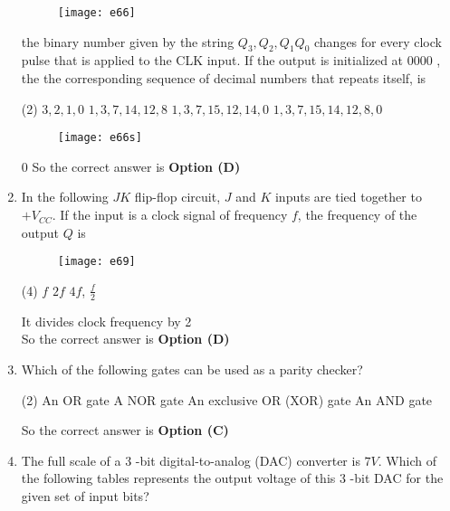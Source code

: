 \begin{enumerate}
	\begin{figure}[H]
		\centering
		\texttt{[image: e66]}
	\end{figure}
	the binary number given by the string $Q_{3}, Q_{2}, Q_{1} Q_{0}$ changes for every clock pulse that is applied to the CLK input. If the output is initialized at 0000 , the the corresponding sequence of decimal numbers that repeats itself, is
{	}
\begin{tasks}(2)
\task[\textbf{A.}] $3,2,1,0$
\task[\textbf{B.}] $1,3,7,14,12,8$
\task[\textbf{C.}] $1,3,7,15,12,14,0$
\task[\textbf{D.}] $1,3,7,15,14,12,8,0$
\end{tasks}
\begin{answer}
\begin{figure}[H]
	\centering
	\texttt{[image: e66s]}
\end{figure}0
So the correct answer is \textbf{Option (D)}
\end{answer}
	\item In the following $J K$ flip-flop circuit, $J$ and $K$ inputs are tied together to $+V_{C C} .$ If the input is a clock signal of frequency $f$, the frequency of the output $Q$ is
{	}
\begin{figure}[H]
\centering
\texttt{[image: e69]}
\end{figure}
\begin{tasks}(4)
\task[\textbf{A.}] $f$
\task[\textbf{B.}] $2 f$
\task[\textbf{C.}] $4 f$,
\task[\textbf{D.}] $\frac{f}{2}$
\end{tasks}
\begin{answer}
It divides clock frequency by 2\\
So the correct answer is \textbf{Option (D)}
\end{answer}
	\item Which of the following gates can be used as a parity checker?
{	}
\begin{tasks}(2)
\task[\textbf{A.}] An OR gate
\task[\textbf{B.}] A NOR gate
\task[\textbf{C.}] An exclusive OR (XOR) gate
\task[\textbf{D.}] An AND gate
\end{tasks}
\begin{answer}
So the correct answer is \textbf{Option (C)}
\end{answer}
	\item The full scale of a 3 -bit digital-to-analog (DAC) converter is $7 V$. Which of the following tables represents the output voltage of this 3 -bit DAC for the given set of input bits?

\end{enumerate}
